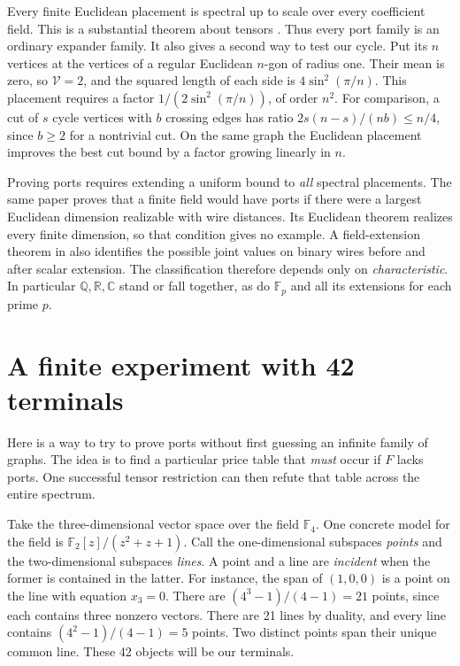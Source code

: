 \documentclass[11pt]{article}
\theoremstyle{definition}
\newcommand{\F}{\mathbb F}
\newcommand{\R}{\mathbb R}
\newcommand{\Var}{\mathcal V}
\begin{document}
Every finite Euclidean placement is spectral up to scale over every
coefficient field. This is a substantial theorem about tensors
\cite{euclid}. Thus every port family is an ordinary expander family.
It also gives a second way to test our cycle. Put its \(n\) vertices at
the vertices of a regular Euclidean \(n\)-gon of radius one. Their mean
is zero, so \(\Var=2\), and the squared length of each side is
\(4\sin^2(\pi/n)\). This placement requires a factor
\(1/(2\sin^2(\pi/n))\), of order \(n^2\). For comparison, a cut of \(s\)
cycle vertices with \(b\) crossing edges has ratio
\(2s(n-s)/(nb)\le n/4\), since \(b\ge2\) for a nontrivial cut.
On the same graph the Euclidean placement improves the best cut bound by
a factor growing linearly in \(n\).

Proving ports requires extending a uniform bound to \emph{all}
spectral placements. The same paper proves that a finite field would
have ports if there were a largest Euclidean dimension realizable with
wire distances. Its Euclidean theorem realizes every finite dimension, so
that condition gives no example. A field-extension theorem in
\cite{euclid} also identifies the possible joint values on binary wires
before and after scalar extension. The classification therefore depends only on
\emph{characteristic}. In particular \(\mathbb Q,\R,\mathbb C\) stand or fall together,
as do \(\F_p\) and all its extensions for each prime \(p\).

\section{A finite experiment with 42 terminals}
\label{sec:experiment}

Here is a way to try to prove ports without first guessing an infinite
family of graphs. The idea is to find a particular price table that
\emph{must} occur if \(F\) lacks ports. One successful tensor restriction
can then refute that table across the entire spectrum.

Take the three-dimensional vector space over the field \(\F_4\). One
concrete model for the field is \(\F_2[z]/(z^2+z+1)\). Call the
one-dimensional subspaces \emph{points} and the two-dimensional subspaces
\emph{lines}. A point and a line are \emph{incident} when the former is
contained in the latter. For instance, the span of \((1,0,0)\) is a point
on the line with equation \(x_3=0\). There are \((4^3-1)/(4-1)=21\) points, since
each contains three nonzero vectors. There are 21 lines by duality, and
every line contains \((4^2-1)/(4-1)=5\) points. Two distinct points span
their unique common line. These 42 objects will be our terminals.
\end{document}
